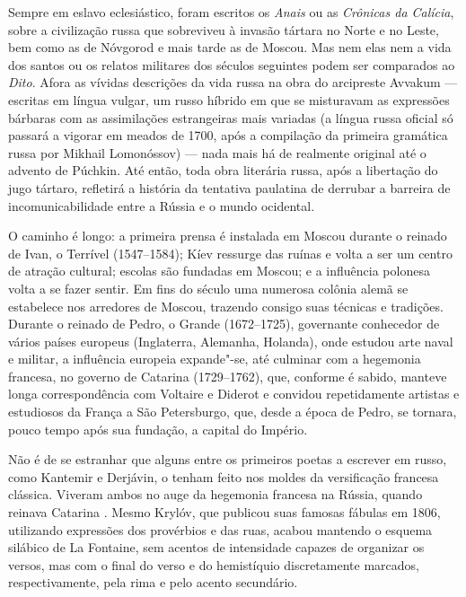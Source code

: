 Sempre em eslavo eclesiástico, foram escritos os \emph{Anais} ou as \emph{Crônicas da
Calícia}, sobre a civilização russa que sobreviveu à invasão tártara no Norte e
no Leste, bem como as de Nóvgorod e mais tarde as de Moscou. Mas nem
elas nem a vida dos santos ou os relatos militares dos séculos seguintes
podem ser comparados ao \emph{Dito}. Afora as vívidas descrições da vida russa
na obra do arcipreste Avvakum --- escritas em língua vulgar, um russo
híbrido em que se misturavam as expres­sões bárbaras com as assimilações
estrangeiras mais variadas (a língua russa oficial só passará a vigorar
em meados de 1700, após a compilação da primeira gramática russa por Mikhail Lomonóssov) --- nada
mais há de realmente original até o advento de Púchkin. Até então, toda
obra literária russa, após a libertação do jugo tártaro, refletirá a
história da tentativa paulatina de derrubar a barreira de
incomunicabilidade entre a Rússia e o mundo ocidental.

O caminho é longo: a primeira prensa é instalada em Moscou durante o
rei­nado de Ivan, o Terrível (1547--1584); Kíev ressurge das ruínas e
volta a ser um centro de atração cultural; escolas são fundadas em
Moscou; e a influência po­lonesa volta a se fazer sentir. Em fins do
século  uma numerosa colônia alemã se estabelece nos arredores de
Moscou, trazendo consigo suas técnicas e tradições. Durante o reinado de
Pedro, o Grande (1672--1725), governante co­nhecedor de vários países
europeus (Inglaterra, Alemanha, Holanda), onde es­tudou arte naval e
militar, a influência europeia expande"-se, até culminar com a hegemonia
francesa, no governo de Catarina  (1729--1762), que, conforme é sabido,
manteve longa correspondência com Voltaire e Diderot e convidou
re­petidamente artistas e estudiosos da França a São Petersburgo, que,
desde a épo­ca de Pedro, se tornara, pouco tempo após sua fundação, a
capital do Império.

Não é de se estranhar que alguns entre os primeiros poetas a escrever em
rus­so, como Kantemir e Derjávin, o tenham feito nos moldes da
versificação fran­cesa clássica. Viveram ambos no auge da hegemonia
francesa na Rússia, quando reinava Catarina . Mesmo
Krylóv, que publicou suas famosas fábulas em 1806, utilizando expressões
dos provérbios e das ruas, acabou man­tendo o esquema silábico de La
Fontaine, sem acentos de intensidade capazes de organizar os versos, mas
com o final do verso e do hemistíquio discreta­mente marcados,
respectivamente, pela rima e pelo acento secundário.

